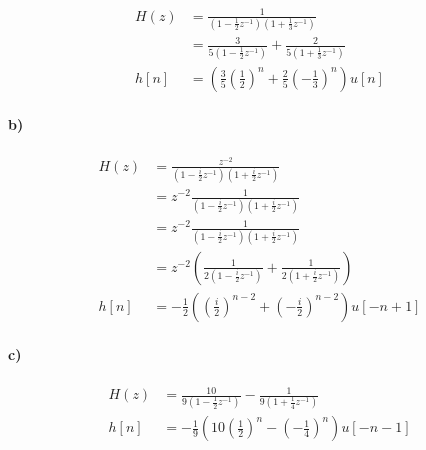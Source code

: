 \documentclass[12pt]{article}
\begin{document}
\begin{align*}
    H(z)&=\frac{1}{\left(1-\frac{1}{2}z^{-1}\right)\left(1+\frac{1}{3}z^{-1}\right)}\\
    &=\frac{3}{5\left(1-\frac{1}{2}z^{-1}\right)}+\frac{2}{5\left(1+\frac{1}{3}z^{-1}\right)}\\
    h[n]&=\left(\frac{3}{5}\left(\frac{1}{2}\right)^n + \frac{2}{5}\left(-\frac{1}{3}\right)^n\right)u[n]
\end{align*}

\paragraph{b)}

\begin{align*}
    H(z)&=\frac{z^{-2}}{\left(1-\frac{i}{2}z^{-1}\right)\left(1+\frac{i}{2}z^{-1}\right)}\\
    &=z^{-2} \frac{1}{\left(1-\frac{i}{2}z^{-1}\right)\left(1+\frac{i}{2}z^{-1}\right)}\\
    &=z^{-2} \frac{1}{\left(1-\frac{i}{2}z^{-1}\right)\left(1+\frac{i}{2}z^{-1}\right)}\\
    &=z^{-2}\left(\frac{1}{2\left(1-\frac{i}{2}z^{-1}\right)}+ \frac{1}{2\left(1+\frac{i}{2}z^{-1}\right)}\right)\\
    h[n]&= -\frac{1}{2}\left(\left(\frac{i}{2}\right)^{n-2} + \left(-\frac{i}{2}\right)^{n-2}\right)u[-n+1]
\end{align*}

\paragraph{c)}

\begin{align*}
    H(z)&=\frac{10}{9\left(1-\frac{1}{2}z^{-1}\right)} - \frac{1}{9\left(1+\frac{1}{4}z^{-1}\right)}\\
    h[n]&=-\frac{1}{9}\left(10\left(\frac{1}{2}\right)^n - \left(-\frac{1}{4}\right)^n \right)u[-n-1]
\end{align*}
\end{document}
